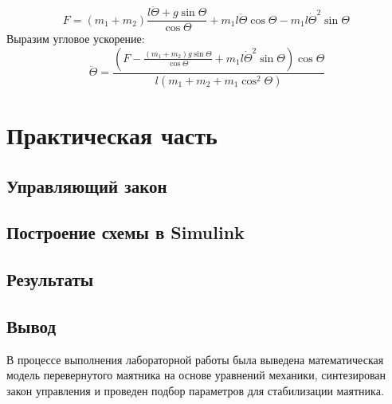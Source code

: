 \documentclass[a5paper, 10pt]{article}
\theoremstyle{definition}
\theoremstyle{plain}
\theoremstyle{remark}
\begin{document}
\begin{equation}
F = (m_1 + m_2) \frac{l \ddot{\Theta} + g \sin \Theta }{ \cos \Theta} + m_1 l \ddot{\Theta} \cos \Theta - m_1 l \dot{\Theta} ^2 \sin \Theta \,
\end{equation}
Выразим угловое ускорение:
\begin{equation}
\ddot{\Theta} = \frac{\left( F - \frac{(m_1 + m_2) g \sin \Theta}{\cos \Theta} + m_1 l \dot{\Theta}^2 \sin \Theta \right) \cos \Theta}{l \left( m_1 + m_2 + m_1 \cos^2 \Theta \right)}
\end{equation}

\newpage
\section{Практическая часть}	
\subsection{Управляющий закон}

\subsection{Построение схемы в Simulink}

\subsection{Результаты}

\subsection{Вывод}
В процессе выполнения лабораторной работы была выведена математическая модель перевернутого маятника на основе уравнений механики, синтезирован закон управления и проведен подбор параметров для стабилизации маятника.
\end{document}
